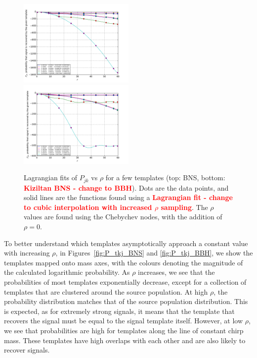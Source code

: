 \documentclass[twocolumn,showpacs,unsortedaddress,superscriptaddress,showkeys,nofootinbib,preprintnumbers,letterpaper]{revtex4-1}
\newcommand{\FIXME}[1]{\textcolor{red}{\textbf{#1}}}
\begin{document}
\begin{figure}
\includegraphics[width=0.5\textwidth]{lagrangian_fit_Ozel.pdf}
\includegraphics[width=0.5\textwidth]{lagrangian_fit_Kiziltan.pdf}
\caption{Lagrangian fits of $P_{jk}$ vs $\rho$ for a few templates (top: BNS, bottom: \FIXME{Kiziltan BNS - change to BBH}). Dots are the data points, and solid lines are the functions found using a \FIXME{Lagrangian fit - change to cubic interpolation with increased $\rho$ sampling}. The $\rho$ values are found using the Chebychev nodes, with the addition of $\rho=0$.}
\label{fig:Pvsrho}
\end{figure}

To better understand which templates asymptotically approach a constant value with increasing $\rho$, in Figures~\ref{fig:P_tkj_BNS} and \ref{fig:P_tkj_BBH}, we show the templates mapped onto mass axes, with the colours denoting the magnitude of the calculated logarithmic probability. As $\rho$ increases, we see that the probabilities of most templates exponentially decrease, except for a collection of templates that are clustered around the source population. At high $\rho$, the probability distribution matches that of the source population distribution. This is expected, as for extremely strong signals, it means that the template that recovers the signal must be equal to the signal template itself. However, at low $\rho$, we see that probabilities are high for templates along the line of constant chirp mass. These templates have high overlaps with each other and are also likely to recover signals.
\end{document}
